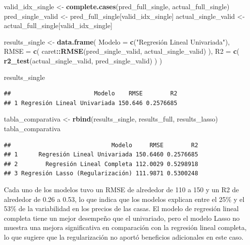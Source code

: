 \documentclass[
]{article}
\newenvironment{Shaded}{\begin{snugshade}}{\end{snugshade}}
\newcommand{\AttributeTok}[1]{\textcolor[rgb]{0.13,0.29,0.53}{#1}}
\newcommand{\FunctionTok}[1]{\textcolor[rgb]{0.13,0.29,0.53}{\textbf{#1}}}
\newcommand{\NormalTok}[1]{#1}
\newcommand{\OtherTok}[1]{\textcolor[rgb]{0.56,0.35,0.01}{#1}}
\newcommand{\SpecialCharTok}[1]{\textcolor[rgb]{0.81,0.36,0.00}{\textbf{#1}}}
\newcommand{\StringTok}[1]{\textcolor[rgb]{0.31,0.60,0.02}{#1}}
\begin{document}
\begin{Shaded}
\begin{Highlighting}[]
\NormalTok{valid\_idx\_single }\OtherTok{\textless{}{-}} \FunctionTok{complete.cases}\NormalTok{(pred\_full\_single, actual\_full\_single)}
\NormalTok{pred\_single\_valid }\OtherTok{\textless{}{-}}\NormalTok{ pred\_full\_single[valid\_idx\_single]}
\NormalTok{actual\_single\_valid }\OtherTok{\textless{}{-}}\NormalTok{ actual\_full\_single[valid\_idx\_single]}

\NormalTok{results\_single }\OtherTok{\textless{}{-}} \FunctionTok{data.frame}\NormalTok{(}
  \AttributeTok{Modelo =} \FunctionTok{c}\NormalTok{(}\StringTok{"Regresión Lineal Univariada"}\NormalTok{),}
  \AttributeTok{RMSE =} \FunctionTok{c}\NormalTok{(}
\NormalTok{    caret}\SpecialCharTok{::}\FunctionTok{RMSE}\NormalTok{(pred\_single\_valid, actual\_single\_valid)}
\NormalTok{  ),}
  \AttributeTok{R2 =} \FunctionTok{c}\NormalTok{(}
    \FunctionTok{r2\_test}\NormalTok{(actual\_single\_valid, pred\_single\_valid)}
\NormalTok{  )}
\NormalTok{)}

\NormalTok{results\_single}
\end{Highlighting}
\end{Shaded}

\begin{verbatim}
##                        Modelo    RMSE        R2
## 1 Regresión Lineal Univariada 150.646 0.2576685
\end{verbatim}

\begin{Shaded}
\begin{Highlighting}[]
\NormalTok{tabla\_comparativa }\OtherTok{\textless{}{-}} \FunctionTok{rbind}\NormalTok{(results\_single, results\_full, results\_lasso)}
\NormalTok{tabla\_comparativa}
\end{Highlighting}
\end{Shaded}

\begin{verbatim}
##                             Modelo     RMSE        R2
## 1      Regresión Lineal Univariada 150.6460 0.2576685
## 2        Regresión Lineal Completa 112.0029 0.5298918
## 3 Regresión Lasso (Regularización) 111.9871 0.5300248
\end{verbatim}

Cada uno de los modelos tuvo un RMSE de alrededor de 110 a 150 y un R2
de alrededor de 0.26 a 0.53, lo que indica que los modelos explican
entre el 25\% y el 53\% de la variabilidad en los precios de las casas.
El modelo de regresión lineal completa tiene un mejor desempeño que el
univariado, pero el modelo Lasso no muestra una mejora significativa en
comparación con la regresión lineal completa, lo que sugiere que la
regularización no aportó beneficios adicionales en este caso.
\end{document}
